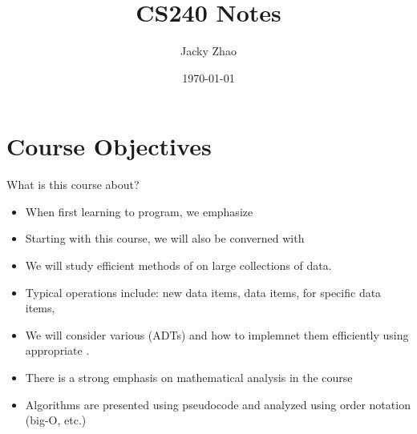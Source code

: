 \documentclass[letterpaper, 12pt]{article}
\newcommand{\red}[1]{{\color{red}{#1}}}
\newcommand{\blue}[1]{{\color{blue}{#1}}}
\begin{document}
    
    \clearpage
    \vspace*{\fill}
    \begin{center}
        \begin{minipage}{\textwidth} 
            \title{CS240 Notes}
            \author{Jacky Zhao}
            \date{\today}
            \maketitle
        \end{minipage} 
    \end{center}
    \vfill
    \thispagestyle{empty}
    \newpage
    \setcounter{page}{1}

    \section{Course Objectives}
    What is this course about?
    \begin{itemize}
        \item When first learning to program, we emphasize \red{correctness}
        \item Starting with this course, we will also be converned with \red{efficiency}
        \item We will study efficient methods of \red{storing, accessing, and performing operations} on large collections of data.
        \item Typical operations include: \red{inserting} new data items, \red{deleting} data items, \red{searching} for specific data items, \red{sorting}\\
        \item We will consider various \red{abstract data types} (ADTs) and how to implemnet them efficiently using appropriate \red{data structures}.
        \item There is a strong emphasis on mathematical analysis in the course
        \item Algorithms are presented using pseudocode and analyzed using order notation (big-O, etc.)
    \end{itemize}
    \bigskip
    \blue{blue}\\
    

    
\end{document}
